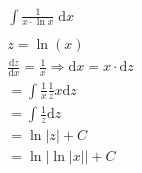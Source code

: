 \begin{align*}
	 & \int \frac{1}{x \cdot \ln x} \;\mathrm{d}x                                                      \\
	\\
	 & z = \ln (x)                                                                                     \\
	 & \frac{\mathrm{d} z}{\mathrm{d} x} = \frac{1}{x} \Rightarrow \mathrm{d} x = x \cdot \mathrm{d} z \\
	 & = \int \frac{1}{x} \frac{1}{z} x \mathrm{d}z                                                    \\
	 & = \int \frac{1}{z} \mathrm{d} z                                                                 \\
	 & = \ln|z| + C                                                                                    \\
	 & = \ln|\ln|x|| + C
\end{align*}
